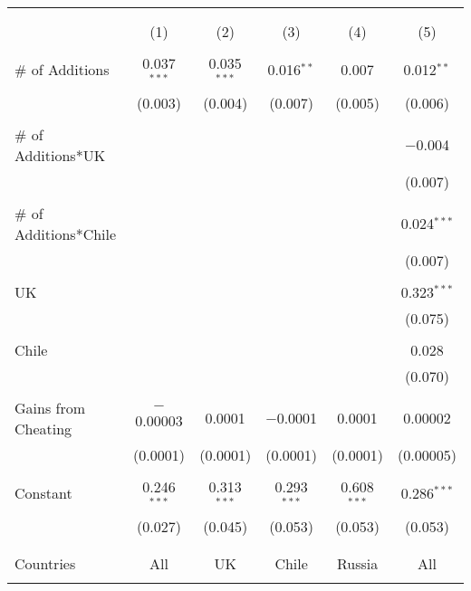 
\begin{table}[!htbp] \centering 
  \caption{} 
  \label{} 
\begin{tabular}{@{\extracolsep{5pt}}lccccc} 
\\[-1.8ex]\hline 
\hline \\[-1.8ex] 
\\[-1.8ex] & (1) & (2) & (3) & (4) & (5)\\ 
\hline \\[-1.8ex] 
 \# of Additions & 0.037$^{***}$ & 0.035$^{***}$ & 0.016$^{**}$ & 0.007 & 0.012$^{**}$ \\ 
  & (0.003) & (0.004) & (0.007) & (0.005) & (0.006) \\ 
  & & & & & \\ 
 \# of Additions*UK &  &  &  &  & $-$0.004 \\ 
  &  &  &  &  & (0.007) \\ 
  & & & & & \\ 
 \# of Additions*Chile &  &  &  &  & 0.024$^{***}$ \\ 
  &  &  &  &  & (0.007) \\ 
  & & & & & \\ 
 UK &  &  &  &  & 0.323$^{***}$ \\ 
  &  &  &  &  & (0.075) \\ 
  & & & & & \\ 
 Chile &  &  &  &  & 0.028 \\ 
  &  &  &  &  & (0.070) \\ 
  & & & & & \\ 
 Gains from Cheating & $-$0.00003 & 0.0001 & $-$0.0001 & 0.0001 & 0.00002 \\ 
  & (0.0001) & (0.0001) & (0.0001) & (0.0001) & (0.00005) \\ 
  & & & & & \\ 
 Constant & 0.246$^{***}$ & 0.313$^{***}$ & 0.293$^{***}$ & 0.608$^{***}$ & 0.286$^{***}$ \\ 
  & (0.027) & (0.045) & (0.053) & (0.053) & (0.053) \\ 
  & & & & & \\ 
\hline \\[-1.8ex] 
Countries & All & UK & Chile & Russia & All \\ 
\hline 
\hline \\[-1.8ex] 
\end{tabular} 
\end{table} 
